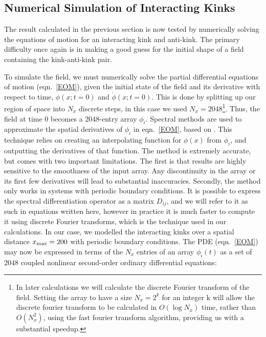 \documentclass[11pt, oneside,titlepage]{article}  	%
\numberwithin{equation}{section}
\begin{document}
\subsection{Numerical Simulation of Interacting Kinks} \label{kink_kink_comp}
The result calculated in the previous section is now tested by numerically solving the equations of motion for an interacting kink and anti-kink. The primary difficulty once again is in making a good guess for the initial shape of a field containing the kink-anti-kink pair.\par
To simulate the field, we must numerically solve the partial differential equations of motion (eqn.~\ref{EOM}), given the initial state of the field and its derivative with respect to time, $\phi(x;t=0)$ and $\dot{\phi}(x;t=0)$. This is done by splitting up our region of space into $N_x$ discrete steps, in this case we used $N_x = 2048$\footnote{In later calculations we will calculate the discrete Fourier transform of the field. Setting the array to have a size $N_x = 2^k$ for an integer k will allow the discrete fourier transform to be calculated in $O(\log N_x)$ time, rather than $O(N_x^2)$, using the fast fourier transform algorithm, providing us with a substantial speedup.}. Thus, the field at time 0 becomes a 2048-entry array $\phi_i$. Spectral methods are used to approximate the spatial derivatives of $\phi_i$ in eqn.~\ref{EOM}, based on \cite{spectral}. This technique relies on creating an interpolating function for $\phi(x)$ from $\phi_i$, and outputting the derivatives of that function. The method is extremely accurate, but comes with two important limitations. The first is that results are highly sensitive to the smoothness of the input array. Any discontinuity in the array or its first few derivatives will lead to substantial inaccuracies. Secondly, the method only works in systems with periodic boundary conditions. It is possible to express the spectral differentiation operator as a matrix $D_{ij}$, and we will refer to it as such in equations written here, however in practice it is much faster to compute it using discrete Fourier transforms, which is the technique used in our calculations. In our case, we modelled the interacting kinks over a spatial distance $x_\textup{max} = 200$ with periodic boundary conditions. The PDE (eqn.~\ref{EOM}) may now be expressed in terms of the $N_x$ entries of an array $\phi_i(t)$ as a set of 2048 coupled nonlinear second-order ordinary differential equations:
\end{document}
